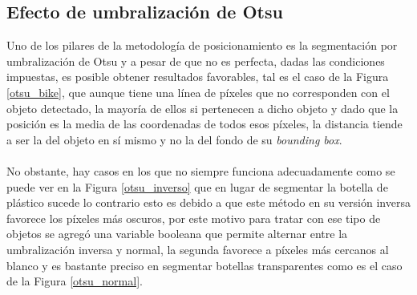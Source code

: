 \subsection{Efecto de umbralización de Otsu}
Uno de los pilares de la metodología de posicionamiento es la segmentación por umbralización de Otsu y a pesar de que no es perfecta, dadas las condiciones impuestas, es posible obtener resultados favorables, tal es el caso de la Figura \ref{otsu_bike}, que aunque tiene una línea de píxeles que no corresponden con el objeto detectado, la mayoría de ellos si pertenecen a dicho objeto y dado que la posición es la media de las coordenadas de todos esos píxeles, la distancia tiende a ser la del objeto en sí mismo y no la del fondo de su \textit{bounding box}. 
\\
\\
No obstante, hay casos en los que no siempre funciona adecuadamente como se puede ver en la Figura \ref{otsu_inverso} que en lugar de segmentar la botella de plástico sucede lo contrario esto es debido a que este método en su versión inversa favorece los píxeles más oscuros, por este motivo para tratar con ese tipo de objetos se agregó una variable booleana que permite alternar entre la umbralización inversa y normal, la segunda favorece a píxeles más cercanos al blanco y es bastante preciso en segmentar botellas transparentes como es el caso de la Figura \ref{otsu_normal}.
